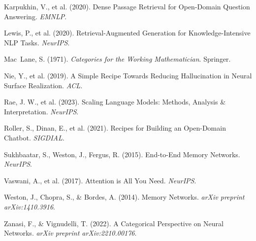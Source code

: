 \documentclass{article}
\begin{document}
\begin{thebibliography}{99}
Karpukhin, V., et al. (2020).
Dense Passage Retrieval for Open-Domain Question Answering.
\emph{EMNLP}.

Lewis, P., et al. (2020).
Retrieval-Augmented Generation for Knowledge-Intensive NLP Tasks.
\emph{NeurIPS}.

Mac~Lane, S. (1971).
\emph{Categories for the Working Mathematician}.
Springer.

Nie, Y., et al. (2019).
A Simple Recipe Towards Reducing Hallucination in Neural Surface Realization.
\emph{ACL}.

Rae, J. W., et al. (2023).
Scaling Language Models: Methods, Analysis & Interpretation.
\emph{NeurIPS}.

Roller, S., Dinan, E., et al. (2021).
Recipes for Building an Open-Domain Chatbot.
\emph{SIGDIAL}.

Sukhbaatar, S., Weston, J., Fergus, R. (2015).
End-to-End Memory Networks.
\emph{NeurIPS}.

Vaswani, A., et al. (2017).
Attention is All You Need.
\emph{NeurIPS}.

Weston, J., Chopra, S., \& Bordes, A. (2014).
Memory Networks.
\emph{arXiv preprint arXiv:1410.3916}.

Zanasi, F., \& Vignudelli, T. (2022).
A Categorical Perspective on Neural Networks.
\emph{arXiv preprint arXiv:2210.00176}.

\end{thebibliography}
\end{document}

